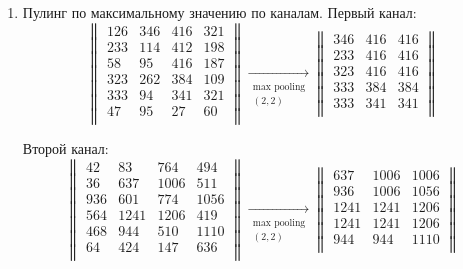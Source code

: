 \documentclass[12pt, a4paper]{extarticle}
\begin{document}
\begin{enumerate}
    \item Пулинг по максимальному значению по каналам.
        Первый канал:
        \begin{equation}
            \begin{Vmatrix}
                126 & 346 & 416 & 321 \\
                233 & 114 & 412 & 198 \\
                58 & 95 & 416 & 187 \\
                323 & 262 & 384 & 109 \\
                333 & 94 & 341 & 321 \\
                47 & 95 & 27 & 60 \\
            \end{Vmatrix}
            \xrightarrow[\begin{array}{c} \text{max pooling} \\ (2, 2) \end{array}]{}
            \begin{Vmatrix}
                346 & 416 & 416 \\
                233 & 416 & 416 \\
                323 & 416 & 416 \\
                333 & 384 & 384 \\
                333 & 341 & 341 \\
            \end{Vmatrix}
        \end{equation}
        
        Второй канал:
        \begin{equation}
            \begin{Vmatrix}
                42 & 83 & 764 & 494 \\
                36 & 637 & 1006 & 511 \\
                936 & 601 & 774 & 1056 \\
                564 & 1241 & 1206 & 419 \\
                468 & 944 & 510 & 1110 \\
                64 & 424 & 147 & 636 \\
            \end{Vmatrix}
            \xrightarrow[\begin{array}{c} \text{max pooling} \\ (2, 2) \end{array}]{}
            \begin{Vmatrix}
                637 & 1006 & 1006 \\
                936 & 1006 & 1056 \\
                1241 & 1241 & 1206 \\
                1241 & 1241 & 1206 \\
                944 & 944 & 1110 \\
            \end{Vmatrix}
        \end{equation}
        

\end{enumerate}
\end{document}
